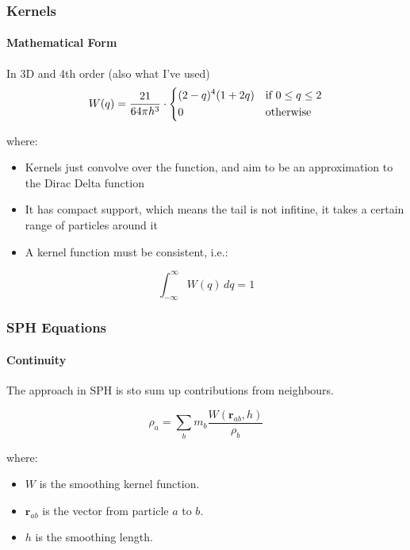 \documentclass[notheorems, aspectratio=169]{beamer}
\begin{document}
  \begin{frame}
    \frametitle{Kernels}
    \framesubtitle{Mathematical Form}

    In 3D and 4th order (also what I've used)
    \begin{equation}
      W(q) = \frac{21}{64\pi h^3} \cdot
      \begin{dcases}
        (2 - q)^4 (1 + 2q) & \text{if } 0 \leq q \leq 2 \\
        0 & \text{otherwise}
      \end{dcases}
      \end{equation}
    
    where:
    \begin{itemize}
      \item Kernels just convolve over the function, and aim to be an approximation to the Dirac Delta function
      \item It has compact support, which means the tail is not infitine, it takes a certain range of particles around it
      \item A kernel function must be consistent, i.e.:
    \end{itemize}

    \begin{equation}
      \int_{-\infty}^{\infty} W(q) \, dq = 1
      \end{equation}
    
    \end{frame}
    



  \begin{frame}[fragile]
  \frametitle{SPH Equations}
  \framesubtitle{Continuity}
  
  The approach in SPH is sto sum up contributions from neighbours.
  
  \begin{equation}
  \rho_a = \sum_{b} m_b \frac{W(\mathbf{r}_{ab}, h)}{\rho_b}
  \end{equation}
  
  
  where:
  \begin{itemize}
    \item \( W \) is the smoothing kernel function.
    \item \( \mathbf{r}_{ab} \) is the vector from particle \( a \) to \( b \).
    \item \( h \) is the smoothing length.
  \end{itemize}
  
  \end{frame}
\end{document}
